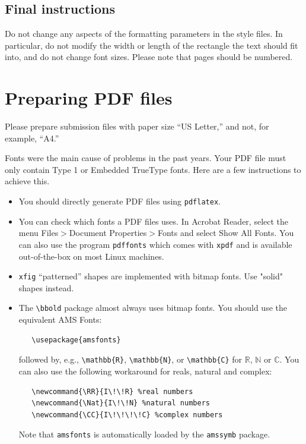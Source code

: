 \documentclass{article}
\begin{document}
\subsection{Final instructions}

Do not change any aspects of the formatting parameters in the style files.  In
particular, do not modify the width or length of the rectangle the text should
fit into, and do not change font sizes. Please note that pages should be
numbered.


\section{Preparing PDF files}


Please prepare submission files with paper size ``US Letter,'' and not, for
example, ``A4.''


Fonts were the main cause of problems in the past years. Your PDF file must only
contain Type 1 or Embedded TrueType fonts. Here are a few instructions to
achieve this.


\begin{itemize}


\item You should directly generate PDF files using \verb+pdflatex+.


\item You can check which fonts a PDF files uses.  In Acrobat Reader, select the
  menu Files$>$Document Properties$>$Fonts and select Show All Fonts. You can
  also use the program \verb+pdffonts+ which comes with \verb+xpdf+ and is
  available out-of-the-box on most Linux machines.


\item \verb+xfig+ ``patterned'' shapes are implemented with bitmap fonts.  Use
  "solid" shapes instead.


\item The \verb+\bbold+ package almost always uses bitmap fonts.  You should use
  the equivalent AMS Fonts:
\begin{verbatim}
   \usepackage{amsfonts}
\end{verbatim}
followed by, e.g., \verb+\mathbb{R}+, \verb+\mathbb{N}+, or \verb+\mathbb{C}+
for $\mathbb{R}$, $\mathbb{N}$ or $\mathbb{C}$.  You can also use the following
workaround for reals, natural and complex:
\begin{verbatim}
   \newcommand{\RR}{I\!\!R} %real numbers
   \newcommand{\Nat}{I\!\!N} %natural numbers
   \newcommand{\CC}{I\!\!\!\!C} %complex numbers
\end{verbatim}
Note that \verb+amsfonts+ is automatically loaded by the \verb+amssymb+ package.


\end{itemize}
\end{document}
